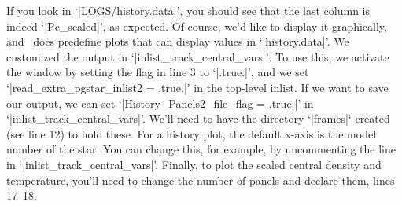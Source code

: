 \begin{mesaproject}
If you look in `|LOGS/history.data|', you should see that the last column is indeed `|Pc_scaled|', as expected. Of course, we'd like to display it graphically, and \mesa\ does predefine plots that can display values in `|history.data|'. We customized the output in `|inlist_track_central_vars|':
To use this, we activate the window by setting the flag in line 3 to `|.true.|', and we set `|read_extra_pgstar_inlist2 = .true.|' in the top-level inlist. If we want to save our output, we can set `|History_Panels2_file_flag = .true.|' in `|inlist_track_central_vars|'. We'll need to have the directory `|frames|` created (see line 12) to hold these. For a history plot, the default x-axis is the model number of the star. You can change this, for example, by uncommenting the line 
in `|inlist_track_central_vars|'. Finally, to plot the scaled central density and temperature, you'll need to change the number of panels and declare them, lines 17--18.

\end{mesaproject}

\UndefineShortVerb{\|}
